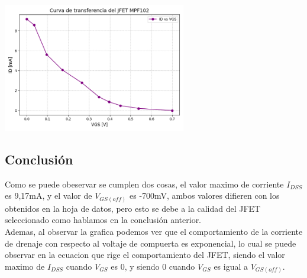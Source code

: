 \begin{table}[ht]
\end{table}

\vspace{0.05cm}

\includegraphics[width=8cm]{./imagenes/ejercicio2.png}

\newpage

\subsection{Conclusión}

Como se puede obeservar se cumplen dos cosas, el valor maximo de corriente $I_{DSS}$ es 9,17mA, y el valor de $V_{GS(off)}$ es -700mV, ambos valores difieren con los obtenidos en la hoja de datos, pero esto se debe a la calidad del JFET seleccionado como hablamos en la conclusión anterior.\\
Ademas, al observar la grafica podemos ver que el comportamiento de la corriente de drenaje con respecto al voltaje de compuerta es exponencial, lo cual se puede observar en la ecuacion que rige el comportamiento del JFET, siendo el valor maximo de  $I_{DSS}$ cuando $V_{GS}$ es 0, y siendo 0 cuando $V_{GS}$ es igual a $V_{GS(off)}$.

